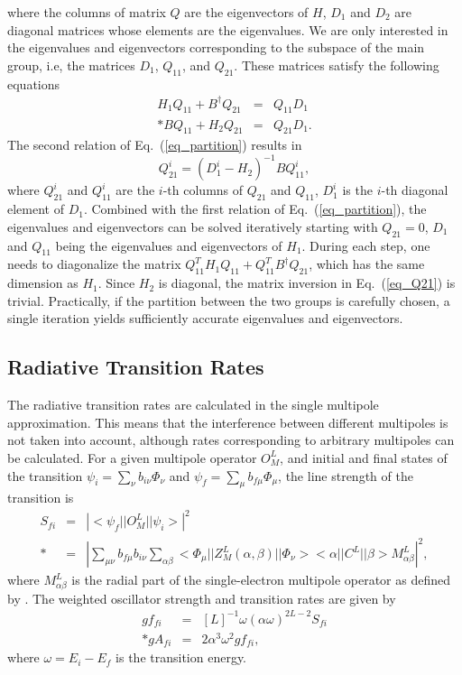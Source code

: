 \documentclass[preprint, floatfix, pra, showpacs, showkeys]{revtex4}
\begin{document}
where the columns of matrix $Q$ are the eigenvectors of $H$, $D_1$ and $D_2$
are diagonal matrices whose elements are the eigenvalues. We are only
interested in the eigenvalues and eigenvectors corresponding to the subspace
of the main group, i.e, the matrices $D_1$, $Q_{11}$, and $Q_{21}$. These
matrices satisfy the following equations
\begin{eqnarray}
\label{eq_partition}
H_1 Q_{11} + B^{\dagger}Q_{21} &=&  Q_{11} D_1 \nonumber \\*
B Q_{11} + H_2 Q_{21} &=& Q_{21} D_1 .
\end{eqnarray}
The second relation of Eq.~(\ref{eq_partition}) results in 
\begin{equation}
\label{eq_Q21}
Q_{21}^{i} = (D_1^{i} - H_2)^{-1}B Q_{11}^{i},
\end{equation}
where $Q_{21}^{i}$ and $Q_{11}^{i}$ are the $i$-th columns of $Q_{21}$ and
$Q_{11}$, $D_1^{i}$ is the $i$-th diagonal element of $D_1$. Combined with the
first relation of Eq.~(\ref{eq_partition}), the eigenvalues and
eigenvectors can 
be solved iteratively starting with $Q_{21} = 0$, $D_1$ and $Q_{11}$ being the
eigenvalues and eigenvectors of $H_1$. During each step, one needs to
diagonalize the matrix $Q_{11}^{T} H_1 Q_{11} + Q_{11}^{T}B^{\dagger}Q_{21}$,
which has the same dimension as $H_1$. Since $H_2$ is diagonal, the matrix
inversion in Eq.~(\ref{eq_Q21}) is trivial. Practically, if the partition
between the two groups is carefully chosen, a single iteration yields
sufficiently accurate eigenvalues and eigenvectors.

\subsection{Radiative Transition Rates}
The radiative transition rates are calculated in the single multipole
approximation. This means that the interference between different multipoles
is not taken into account, although rates corresponding to arbitrary
multipoles can be calculated. For a given multipole operator $O^L_M$, and
initial and final states of 
the transition $\psi_i = \sum_\nu b_{i\nu}\Phi_\nu$ and $\psi_f = \sum_\mu
b_{f\mu}\Phi_\mu$, the line strength of the transition is 
\begin{eqnarray}
S_{fi} &=& \left|<\psi_f||O^L_M||\psi_i>\right|^2 \nonumber\\*
&=& \left|\sum_{\mu\nu}b_{f\mu}b_{i\nu}\sum_{\alpha\beta}
<\Phi_\mu||Z^L_M(\alpha,\beta)||\Phi_\nu><\alpha||C^L||\beta>
M^L_{\alpha\beta}\right|^2 ,
\end{eqnarray} 
where $M^L_{\alpha\beta}$ is the radial part of the single-electron multipole
operator as defined by \textcite{grant74}.
The weighted oscillator strength and transition rates are given by 
\begin{eqnarray}
gf_{fi} &=& [L]^{-1}\omega(\alpha\omega)^{2L-2} S_{fi} \\*
gA_{fi} &=& 2\alpha^3 \omega^2 gf_{fi},
\end{eqnarray}
where $\omega = E_i - E_f$ is the transition energy. 
\end{document}
